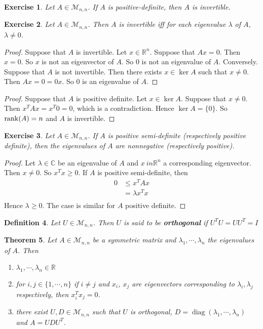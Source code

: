 \documentclass[12pt]{amsart}
\newtheorem{thm}{Theorem}[section]
\newtheorem{defn}[thm]{Definition}
\newtheorem{ex}[thm]{Exercise}
\newcommand{\lam}{\lambda}
\newcommand{\C}{\mathbb{C}}
\newcommand{\R}{\mathbb{R}}
\newcommand{\MM}{\mathcal{M}}
\DeclareMathOperator*{\diag}{diag}
\DeclareMathOperator*{\ke}{ker}
\begin{document}
\begin{ex}
Let $A \in \MM_{n,n}$. If $A$ is positive-definite, then $A$ is invertible.
\end{ex}

\begin{ex}
Let $A \in \MM_{n,n}$. Then $A$ is invertible iff for each eigenvalue $\lam$ of $A$, $\lam \neq 0$.
\end{ex}

\begin{proof}
Suppose that $A$ is invertible. Let $x \in \R^n$. Suppose that $Ax = 0$. Then $x =0$. So $x$ is not an eigenvector of $A$. So $0$ is not an eigenvalue of $A$. Conversely. Suppose that $A$ is not invertible. Then there exists $x \in \ker A$ such that $x \neq 0$. Then $Ax = 0 = 0x$. So $0$ is an eigenvalue of $A$.  
\end{proof}

\begin{proof}
Suppose that $A$ is positive definite. Let $x \in \ker A$. Suppose that $x \neq 0$. Then $x^TAx = x^T0 = 0$, which is a contradiction. Hence $\ke A = \{0\}$. So $\rank(A) = n$ and $A$ is invertible.
\end{proof}

\begin{ex}
Let $A \in \MM_{n,n}$. If $A$ is positive semi-definite (respectively positive definite), then the eigenvalues of $A$ are nonnegative (respectively positive). 
\end{ex}



\begin{proof}
Let $\lambda \in \C$ be an eigenvalue of $A$ and $x\ in \R^n$ a corresponding eigenvector. Then $x \neq 0$. So $x^Tx \geq 0$. If $A$ is positive semi-definite, then
\begin{align*}
0 
& \leq x^TAx \\
&= \lambda x^T x \\
\end{align*}  
Hence $\lam \geq 0$. The case is similar for $A$ positive definite.  
\end{proof}

\begin{defn}
Let $U \in \MM_{n,n}$. Then $U$ is said to be \textbf{orthogonal} if $U^TU = UU^T = I$
\end{defn}

\begin{thm}
Let $A \in \MM_{n,n}$ be a symmetric matrix and $\lam_1, \cdots, \lambda_n$ the eigenvalues of $A$. Then
\begin{enumerate}
\item $\lam_1, \cdots, \lambda_n \in \R$ 
\item for $i,j \in \{1, \cdots, n\}$ if $i \neq j$ and $x_i$, $x_j$ are eigenvectors corresponding to $\lam_i, \lam_j$ respectively, then $x_i^Tx_j = 0$.
\item there exist $U, D \in \MM_{n,n}$ such that $U$ is orthogonal, $D = \diag(\lam_1, \cdots, \lam_n)$ and  $A = UDU^T$. 
\end{enumerate} 
\end{thm}
\end{document}
